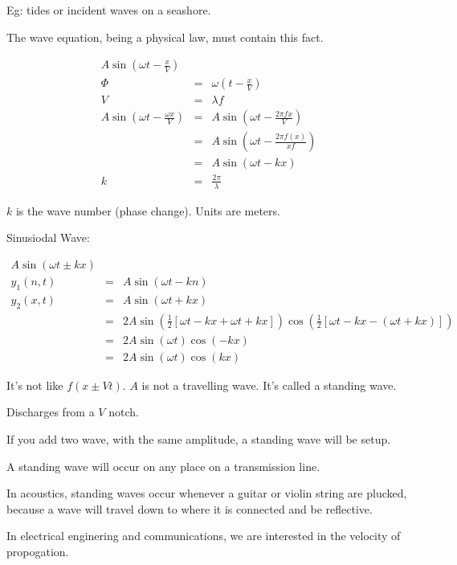 \documentclass[a4paper,12pt]{article}
\begin{document}
Eg: tides or incident waves on a seashore.

The wave equation, being a physical law, must contain this fact.

\begin{eqnarray*}
A \sin{\left(\omega t - \frac{x}{V}\right)} & & \\
\Phi & = & \omega (t - \frac{x}{V}) \\
V & = & \lambda f \\
A \sin{\left( \omega t - \frac{\omega x}{V} \right)} & = & 
A \sin{\left( \omega t - \frac{2 \pi f x}{V} \right)} \\
& = & A \sin{\left( \omega t - \frac{2 \pi f(x)}{x f} \right)} \\
& = & A \sin{(\omega t - k x)} \\
k & = & \frac{2 \pi}{\lambda}
\end{eqnarray*}

$k$ is the wave number (phase change). Units are meters.

Sinusiodal Wave:

\begin{eqnarray*}
A \sin{\left( \omega t \pm kx \right)} & & \\
y_{1} (n, t) & = & A \sin{\left( \omega t - k n \right)} \\
y_{2} (x, t) & = & A \sin{\left( \omega t + k x \right)} \\
& = & 2 A \sin{ \left( \frac{1}{2} \left[ \omega t - k x + \omega t + k x
\right] \right)} \cos{\left( \frac{1}{2} \left[ \omega t - k x - (\omega
t + k x) \right] \right)} \\
& = & 2 A \sin{(\omega t)} \cos{(- k x)} \\
& = & 2 A \sin{(\omega t)} \cos{(k x)}
\end{eqnarray*}


It's not like $ f(x \pm Vt)$. $A$ is not a travelling wave. It's called
a standing wave.

Discharges from a $V$ notch.

If you add two wave, with the same amplitude, a standing wave will be
setup.

A standing wave will occur on any place on a transmission line.

In acoustics, standing waves occur whenever a guitar or violin string
are plucked, because a wave will travel down to where it is connected
and be reflective.

In electrical enginering and communications, we are interested in the
velocity of propogation.
\end{document}
